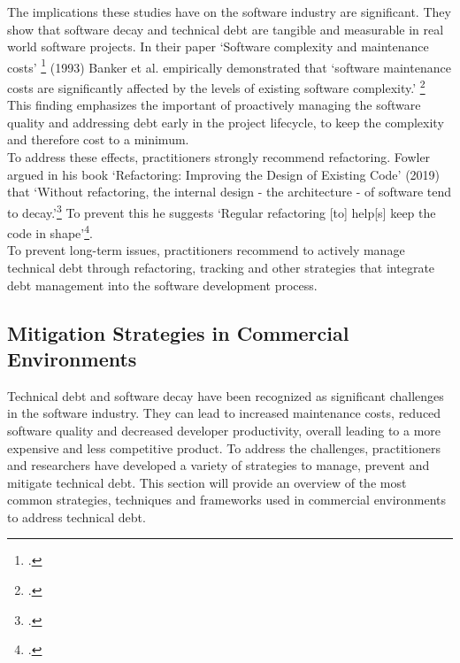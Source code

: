 The implications these studies have on the software industry are significant. They show that software decay and technical debt are tangible and measurable in real world software projects.
In their paper `Software complexity and maintenance costs' \footcite{bankerSoftwareComplexityMaintenance1993} (1993) Banker et al. empirically demonstrated that `software maintenance costs are significantly affected by the levels of existing software complexity.' \footcite[12]{bankerSoftwareComplexityMaintenance1993}
This finding emphasizes the important of proactively managing the software quality and addressing debt early in the project lifecycle, to keep the complexity and therefore cost to a minimum.\\
To address these effects, practitioners strongly recommend refactoring. Fowler argued in his book `Refactoring: Improving the Design of Existing Code' (2019)
that `Without refactoring, the internal design - the architecture - of software tend to decay.'\footcite[58]{fowlerRefactoringImprovingDesign2019}
To prevent this he suggests `Regular refactoring [to] help[s] keep the code in shape'\footcite[58]{fowlerRefactoringImprovingDesign2019}.\\
To prevent long-term issues, practitioners recommend to actively manage technical debt through refactoring, tracking and other strategies 
that integrate debt management into the software development process.\\

\subsection{Mitigation Strategies in Commercial Environments}
Technical debt and software decay have been recognized as significant challenges in the software industry. They can lead to 
increased maintenance costs, reduced software quality and decreased developer productivity, overall leading to a more expensive and less competitive product.
To address the challenges, practitioners and researchers have developed a variety of strategies to manage, prevent and mitigate technical debt.
This section will provide an overview of the most common strategies, techniques and frameworks used in commercial environments to address technical debt.\\

